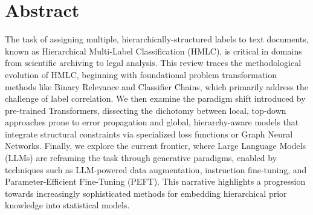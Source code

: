 \chapter*{Abstract}
The task of assigning multiple, hierarchically-structured labels to text documents, known as Hierarchical Multi-Label Classification (HMLC), is critical in domains from scientific archiving to legal analysis. This review traces the methodological evolution of HMLC, beginning with foundational problem transformation methods like Binary Relevance and Classifier Chains, which primarily address the challenge of label correlation. We then examine the paradigm shift introduced by pre-trained Transformers, dissecting the dichotomy between local, top-down approaches prone to error propagation and global, hierarchy-aware models that integrate structural constraints via specialized loss functions or Graph Neural Networks. Finally, we explore the current frontier, where Large Language Models (LLMs) are reframing the task through generative paradigms, enabled by techniques such as LLM-powered data augmentation, instruction fine-tuning, and Parameter-Efficient Fine-Tuning (PEFT). This narrative highlights a progression towards increasingly sophisticated methods for embedding hierarchical prior knowledge into statistical models.
